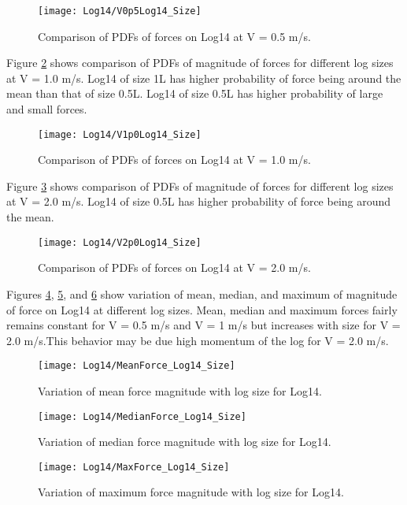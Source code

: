 \begin{figure}
\centering
\texttt{[image: Log14/V0p5Log14\_Size]}
\caption{\label{fig:V0p5Log14_Size}Comparison of PDFs of forces on Log14 at V = 0.5 m/s.}
\end{figure}

\noindent Figure \ref{fig:V1p0Log14_Size} shows comparison of PDFs of magnitude of forces for different log sizes at V = 1.0 m/s. Log14 of size 1L has higher probability of force being around the mean than that of size 0.5L. Log14 of size 0.5L has higher probability of large and small forces.

\begin{figure}
\centering
\texttt{[image: Log14/V1p0Log14\_Size]}
\caption{\label{fig:V1p0Log14_Size}Comparison of PDFs of forces on Log14 at V = 1.0 m/s.}
\end{figure}

\noindent Figure \ref{fig:V2p0Log14_Size} shows comparison of PDFs of magnitude of forces for different log sizes at V = 2.0 m/s. Log14 of size 0.5L has higher probability of force being around the mean.  

\begin{figure}
\centering
\texttt{[image: Log14/V2p0Log14\_Size]}
\caption{\label{fig:V2p0Log14_Size}Comparison of PDFs of forces on Log14 at V = 2.0 m/s.}
\end{figure}

\noindent Figures \ref{fig:MeanForce_Log14_Size}, \ref{fig:MedianForce_Log14_Size}, and \ref{fig:MaxForce_Log14_Size} show variation of mean, median, and maximum of magnitude of force on Log14 at different log sizes. Mean, median and maximum forces fairly remains constant for V = 0.5 m/s and V = 1 m/s but increases with size for V = 2.0 m/s.This behavior may be due high momentum of the log for V  = 2.0 m/s. 

\begin{figure}
\centering
\texttt{[image: Log14/MeanForce\_Log14\_Size]}
\caption{\label{fig:MeanForce_Log14_Size}Variation of mean force magnitude with log size for Log14.}
\end{figure}
\begin{figure}
\centering
\texttt{[image: Log14/MedianForce\_Log14\_Size]}
\caption{\label{fig:MedianForce_Log14_Size}Variation of median force magnitude with log size for Log14.}
\end{figure}
\begin{figure}
\centering
\texttt{[image: Log14/MaxForce\_Log14\_Size]}
\caption{\label{fig:MaxForce_Log14_Size}Variation of maximum force magnitude with log size for Log14.}
\end{figure}

